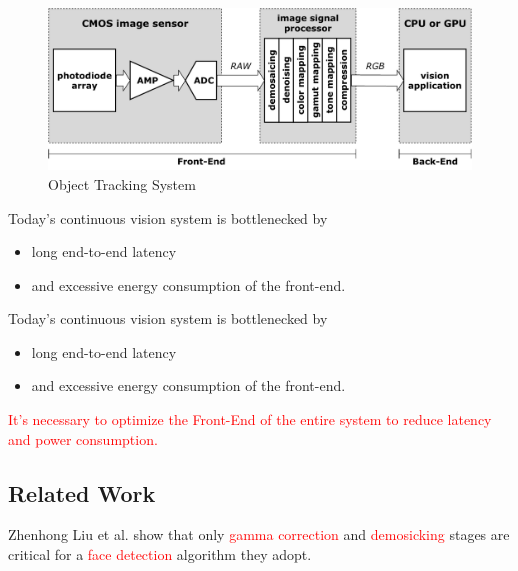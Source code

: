 \documentclass{beamer}
\begin{document}
\begin{frame}
    \begin{figure}[htpb]
        \begin{center}
            \includegraphics[width=1.0\linewidth]{fig/block.pdf}
            \caption{Object Tracking System}
        \end{center}
    \end{figure}
\end{frame}

\begin{frame}
    Today’s continuous vision system is bottlenecked by
    \begin{itemize}[<+-| alert@+>]
        \item long end-to-end latency
        \item and excessive energy consumption of the front-end.
    \end{itemize}
\end{frame}

\begin{frame}
    Today’s continuous vision system is bottlenecked by
    \begin{itemize}
        \item long end-to-end latency
        \item and excessive energy consumption of the front-end.
    \end{itemize}
    \textcolor{red}{It's necessary to optimize the Front-End of the entire system to reduce latency and power consumption.}
\end{frame}

\subsection{Related Work}

\begin{frame}

    Zhenhong Liu et al. show that only \textcolor{red}{gamma correction} and \textcolor{red}{demosicking} stages are critical for a \textcolor{red}{face detection} algorithm they adopt.

\end{frame}
\end{document}
